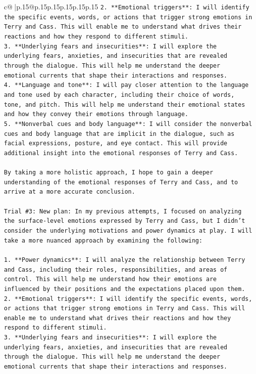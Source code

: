 \documentclass{article}
\begin{document}
{\begin{supertabular}{c@{$\;$}|p{.15\linewidth}@{}p{.15\linewidth}p{.15\linewidth}p{.15\linewidth}p{.15\linewidth}p{.15\linewidth}}
{{{\texttt{2. **Emotional triggers**: I will identify the specific events, words, or actions that trigger strong emotions in Terry and Cass. This will enable me to understand what drives their reactions and how they respond to different stimuli.} \\
\texttt{3. **Underlying fears and insecurities**: I will explore the underlying fears, anxieties, and insecurities that are revealed through the dialogue. This will help me understand the deeper emotional currents that shape their interactions and responses.} \\
\texttt{4. **Language and tone**: I will pay closer attention to the language and tone used by each character, including their choice of words, tone, and pitch. This will help me understand their emotional states and how they convey their emotions through language.} \\
\texttt{5. **Nonverbal cues and body language**: I will consider the nonverbal cues and body language that are implicit in the dialogue, such as facial expressions, posture, and eye contact. This will provide additional insight into the emotional responses of Terry and Cass.} \\
\\ 
\texttt{By taking a more holistic approach, I hope to gain a deeper understanding of the emotional responses of Terry and Cass, and to arrive at a more accurate conclusion.} \\
\\ 
\texttt{Trial \#3: New plan: In my previous attempts, I focused on analyzing the surface{-}level emotions expressed by Terry and Cass, but I didn't consider the underlying motivations and power dynamics at play. I will take a more nuanced approach by examining the following:} \\
\\ 
\texttt{1. **Power dynamics**: I will analyze the relationship between Terry and Cass, including their roles, responsibilities, and areas of control. This will help me understand how their emotions are influenced by their positions and the expectations placed upon them.} \\
\texttt{2. **Emotional triggers**: I will identify the specific events, words, or actions that trigger strong emotions in Terry and Cass. This will enable me to understand what drives their reactions and how they respond to different stimuli.} \\
\texttt{3. **Underlying fears and insecurities**: I will explore the underlying fears, anxieties, and insecurities that are revealed through the dialogue. This will help me understand the deeper emotional currents that shape their interactions and responses.} \\
}}}
\end{supertabular}}
\end{document}
